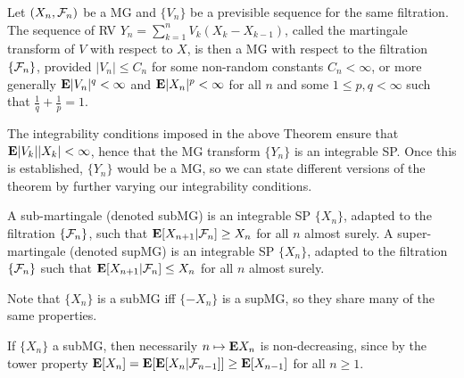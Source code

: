 \begin{theorem*} 
Let $(X_n, \mathcal{F}_n)$ be a MG and $\{V_n\}$ be a previsible sequence for the same
filtration. The sequence of RV $Y_n = \sum_{k=1}^n V_k(X_k - X_{k-1})$, called
the martingale transform of $V$ with respect to $X$, is then a MG with respect
to the filtration $\{\mathcal{F}_n\}$, provided $|V_n| \le C_n$ for some non-random
constants $C_n < \infty$, or more generally $\mathbf{E}|V_n|^q < \infty$ and $\mathbf{E}|X_n|^p
< \infty$ for all $n$ and some $1 \le p, q < \infty$ such that $\frac1q +
\frac1p = 1$.
\end{theorem*} 

\begin{remark*} 
The integrability conditions imposed in the above Theorem ensure that
$\mathbf{E}|V_k||X_k| < \infty$, hence that the MG transform $\{Y_n\}$ is an integrable
SP. Once this is established, $\{Y_n\}$ would be a MG, so we can state different
versions of the theorem by further varying our integrability conditions.
\end{remark*} 


\begin{definition*} 
A sub-martingale (denoted subMG) is an integrable SP $\{X_n\}$, adapted to the
filtration $\{\mathcal{F}_n\}$, such that $\mathbf{E}[X_{n+1} | \mathcal{F}_n] \ge X_n$ for all $n$ almost
surely. A super-martingale (denoted supMG) is an integrable SP $\{X_n\}$,
adapted to the filtration $\{\mathcal{F}_n\}$ such that $\mathbf{E}[X_{n+1} | \mathcal{F}_n] \le X_n$ for
all $n$ almost surely.
\end{definition*} 

\begin{remark*} 
Note that $\{X_n\}$ is a subMG iff $\{-X_n\}$ is a supMG, so they share many of
the same properties.
\end{remark*} 

\begin{remark*} 
If $\{X_n\}$ a subMG, then necessarily $n \mapsto \mathbf{E} X_n$ is non-decreasing,
since by the tower property $\mathbf{E}[X_n] = \mathbf{E}[\mathbf{E}[X_n | \mathcal{F}_{n-1}]] \ge \mathbf{E}[X_{n-1}]$
for all $n \ge 1$.
\end{remark*} 



